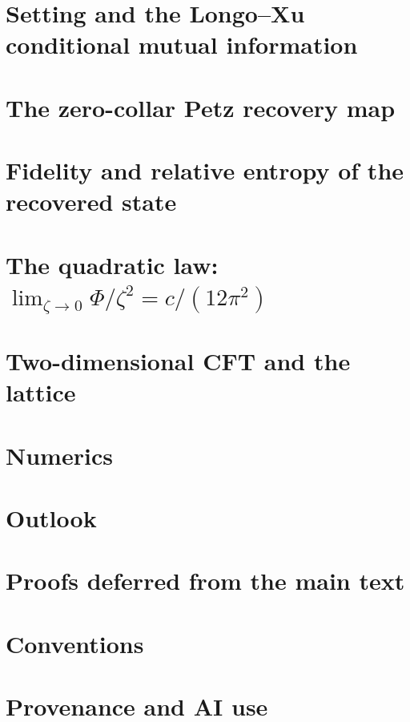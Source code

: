 \documentclass[11pt,a4paper]{article}
\theoremstyle{definition}\newtheorem{definition}[theorem]{Definition}\newtheorem{remark}[theorem]{Remark}
\begin{document}
\section{Setting and the Longo--Xu conditional mutual information}


\section{The zero-collar Petz recovery map}


\section{Fidelity and relative entropy of the recovered state}


\section{The quadratic law: $\lim_{\zeta\to0}\Phi/\zeta^2=c/(12\pi^2)$}


\section{Two-dimensional CFT and the lattice}


\section{Numerics}


\section{Outlook}


\appendix
\section{Proofs deferred from the main text}

\section{Conventions}

\section*{Provenance and AI use}
\end{document}
